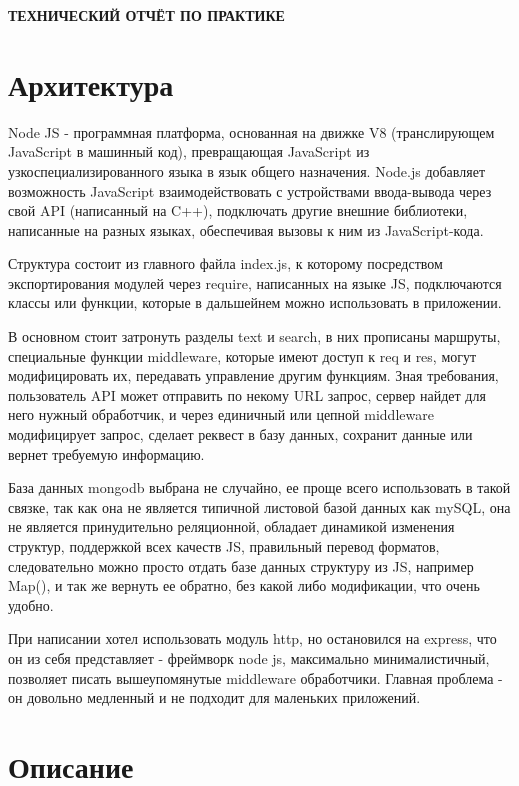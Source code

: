 \begin{center}
\bfseries{\large ТЕХНИЧЕСКИЙ ОТЧЁТ ПО ПРАКТИКЕ}
\end{center}

\section*{Архитектура}

Node JS - программная платформа, основанная на движке V8 (транслирующем JavaScript в машинный код), превращающая JavaScript из узкоспециализированного языка в язык общего назначения. Node.js добавляет возможность JavaScript взаимодействовать с устройствами ввода-вывода через свой API (написанный на C++), подключать другие внешние библиотеки, написанные на разных языках, обеспечивая вызовы к ним из JavaScript-кода.

Структура состоит из главного файла index.js, к которому посредством экспортирования модулей через require, написанных на языке JS, подключаются классы или функции, которые в дальшейнем можно использовать в приложении.

В основном стоит затронуть разделы text и search, в них прописаны маршруты, специальные функции middleware, которые имеют доступ к req и res, могут модифицировать их, передавать управление другим функциям. Зная требования, пользователь API может отправить по некому URL запрос, сервер найдет для него нужный обработчик, и через единичный или цепной middleware модифицирует запрос, сделает реквест в базу данных, сохранит данные или вернет требуемую информацию.

База данных mongodb выбрана не случайно, ее проще всего использовать в такой связке, так как она не является типичной листовой базой данных как mySQL, она не является принудительно реляционной, обладает динамикой изменения структур, поддержкой всех качеств JS, правильный перевод форматов, следовательно можно просто отдать базе данных структуру из JS, например Map(), и так же вернуть ее обратно, без какой либо модификации, что очень удобно.

При написании хотел использовать модуль http, но остановился на express, что он из себя представляет - фреймворк node js, максимально минималистичный, позволяет писать вышеупомянутые middleware обработчики. Главная проблема - он довольно медленный и не подходит для маленьких приложений.



\section*{Описание}

